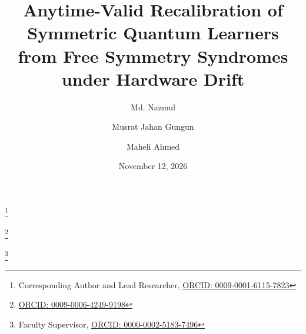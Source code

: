 \documentclass[aps,pra,twocolumn,superscriptaddress,10pt,floatfix]{revtex4-2}
\begin{document}
\title{Anytime-Valid Recalibration of Symmetric Quantum Learners from Free Symmetry Syndromes under Hardware Drift}

\author{Md. Nazmul}
\thanks{Corresponding Author and Lead Researcher, \href{https://orcid.org/0009-0001-6115-7823}{\textsf{ORCID: 0009-0001-6115-7823}}}

\author{Musrat Jahan Gungun}
\thanks{\href{https://orcid.org/0009-0006-4249-9198}{\textsf{ORCID: 0009-0006-4249-9198}}}

\author{Maheli Ahmed}
\thanks{Faculty Supervisor, \href{https://orcid.org/0000-0002-5183-7496}{\textsf{ORCID: 0000-0002-5183-7496}}}

\date{November 12, 2026}
\end{document}

